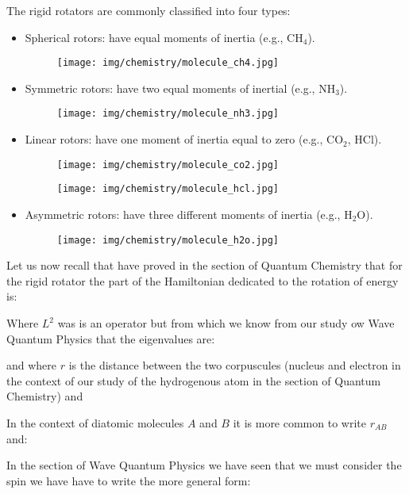 	The rigid rotators are commonly classified into four types:
	\begin{itemize}
		\item Spherical rotors: have equal moments of inertia (e.g., $\mathrm{CH}_4$).
		\begin{figure}[H]
			\centering
			\texttt{[image: img/chemistry/molecule\_ch4.jpg]}
		\end{figure}
		
		\item Symmetric rotors: have two equal moments of inertial (e.g., $\mathrm{NH}_3$).
		\begin{figure}[H]
			\centering
			\texttt{[image: img/chemistry/molecule\_nh3.jpg]}
		\end{figure}
		
		\item Linear rotors: have one moment of inertia equal to zero (e.g., $\mathrm{CO_2}$, $\mathrm{HCl}$).
		\begin{figure}[H]
			\centering
			\texttt{[image: img/chemistry/molecule\_co2.jpg]}
		\end{figure}
		\begin{figure}[H]
			\centering
			\texttt{[image: img/chemistry/molecule\_hcl.jpg]}
		\end{figure}

		\item Asymmetric rotors: have three different moments of inertia (e.g., $\mathrm{H}_2\mathrm{O}$).
		\begin{figure}[H]
			\centering
			\texttt{[image: img/chemistry/molecule\_h2o.jpg]}
		\end{figure}
	\end{itemize}
	Let us now recall that have proved in the section of Quantum Chemistry that for the rigid rotator the part of the Hamiltonian dedicated to the rotation of energy is:
	
	Where $L^2$ was is an operator but from which we know from our study ow Wave Quantum Physics that the eigenvalues are:
	
	and where $r$ is the distance between the two corpuscules (nucleus and electron in the context of our study of the hydrogenous atom in the section of Quantum Chemistry) and
	
	In the context of diatomic molecules $A$ and $B$ it is more common to write $r_{AB}$ and:
	

	In the section of Wave Quantum Physics we have seen that we must consider the spin we have have to write the more general form:
	
